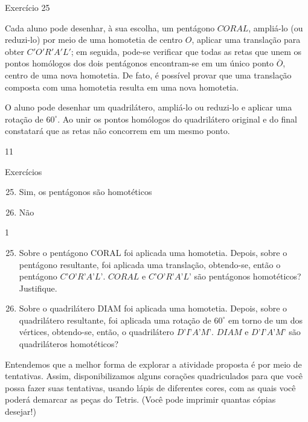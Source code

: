 \clearpage
\begin{sugestions}{Exercício 25}
{
Cada aluno pode desenhar, à sua escolha, um pentágono $CORAL$, ampliá-lo (ou reduzi-lo) por meio de uma homotetia de centro $O$, aplicar uma translação para obter $C'O'R'A'L'$; em seguida, pode-se verificar que todas as retas que unem os pontos homólogos dos dois pentágonos encontram-se em um único ponto $\overline{O}$, centro de uma nova homotetia. De fato, é possível provar que uma translação composta com uma homotetia resulta em uma nova homotetia.


O aluno pode desenhar um quadrilátero, ampliá-lo ou reduzi-lo e aplicar uma rotação de $60^{\circ}$. Ao unir os pontos homólogos do quadrilátero original e do final constatará que as retas não concorrem em um mesmo ponto. 
}{1}{1}
\end{sugestions}

\begin{answer}{Exercícios}
{\exerciselist
\begin{enumerate}\setcounter{enumi}{24}
\item Sim, os pentágonos são homotéticos
\item Não
\end{enumerate}
}{1}
\end{answer}

\begin{enumerate}\setcounter{enumi}{24}
\item Sobre o pentágono CORAL foi aplicada uma homotetia. Depois, sobre o pentágono resultante, foi aplicada uma translação, obtendo-se, então o pentágono $C’O’R’A’L’$. $CORAL$ e $C’O’R’A’L’$ são pentágonos homotéticos? Justifique. 

\item Sobre o quadrilátero DIAM foi aplicada uma homotetia. Depois, sobre o quadrilátero resultante, foi aplicada uma rotação de $60^{\circ}$ em torno de um dos vértices, obtendo-se, então, o quadrilátero $D’I’A’M’$. $DIAM$ e $D’I’A’M’$ são quadriláteros homotéticos?

\end{enumerate}



\ifnum{}
\clearpage
\else
\notasfinais
\fi

Entendemos que a melhor forma de explorar a atividade proposta é por meio de tentativas. Assim, disponibilizamos alguns corações quadriculados para que você possa fazer suas tentativas, usando lápis de diferentes cores, com as quais você poderá demarcar as peças do Tetris. (Você pode imprimir quantas cópias desejar!)

